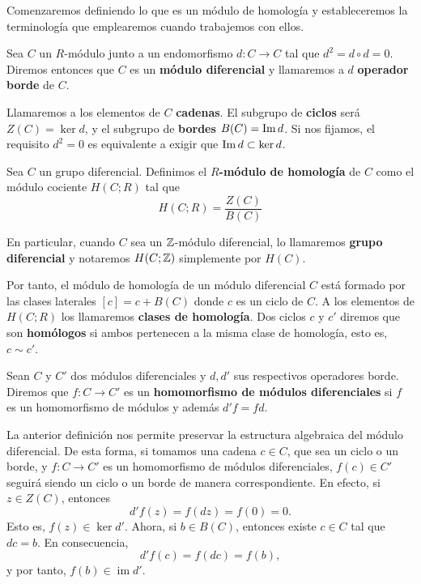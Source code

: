 Comenzaremos definiendo lo que es un módulo de homología y estableceremos la terminología
que emplearemos cuando trabajemos con ellos.

\begin{definicion}
	Sea \(C\) un \(R\)-módulo junto a un endomorfismo \(d: C \rightarrow C\) tal que \(d^{2}
	= d \circ d = 0\). Diremos entonces que \(C\) es un \textbf{módulo diferencial} y
	llamaremos a \(d\) \textbf{operador borde} de \(C\).
\end{definicion}

Llamaremos a los elementos de \(C\) \textbf{cadenas}. El subgrupo de \textbf{ciclos}
será \(Z(C) = \ker d\), y el subgrupo de \textbf{bordes} \(B(C) = \operatorname{Im} d\). Si nos
fijamos, el requisito \(d^{2} = 0\) es equivalente a exigir que \(\operatorname{Im}{d}\subset \ker
{d}\).

\begin{definicion}
	Sea \(C\) un grupo diferencial. Definimos el \textbf{\(R\)-módulo de homología} de
	\(C\) como el módulo cociente \(H(C;R)\) tal que
	\[
	H(C;R) = \frac{Z(C)}{B(C)}
	\]
\end{definicion}

En particular, cuando \(C\) sea un \(\mathbb{Z}\)-módulo diferencial, lo llamaremos \textbf{grupo
	diferencial} y notaremos \(H(C;\mathbb{Z})\) simplemente por \(H(C)\).

Por tanto, el módulo de homología de un módulo diferencial \(C\) está formado por
las clases laterales \([c] = c + B(C)\) donde \(c\) es un ciclo de \(C\). A los elementos
de \(H(C;R)\) los llamaremos \textbf{clases de homología}. Dos ciclos \(c\) y \(c'\) diremos
que son \textbf{homólogos} si ambos pertenecen a la misma clase de homología, esto
es, \(c \sim c'\).

\begin{definicion}
	Sean \(C\) y \(C'\) dos módulos diferenciales y \(d, d'\) sus respectivos operadores
	borde. Diremos que \(f: C \rightarrow C'\) es un \textbf{homomorfismo de módulos
		diferenciales} si \(f\) es un homomorfismo de módulos y además \(d'f = fd\).
\end{definicion}

La anterior definición nos permite preservar la estructura algebraica del módulo
diferencial. De esta forma, si tomamos una cadena \(c \in C\), que sea un ciclo o un
borde, y \(f\colon C \to C'\) es un homomorfismo de módulos diferenciales,
\(f(c) \in C'\) seguirá siendo un ciclo o un borde de manera correspondiente. En efecto,
si \(z \in Z(C)\), entonces
\[
d'f(z) = f(dz) = f(0) = 0.
\]
Esto es, \(f(z) \in \ker d'\). Ahora, si \(b \in B(C)\), entonces existe \(c \in C\) tal que \(dc = b\). En consecuencia,
\[
d'f(c) = f(dc) = f(b),
\]
y por tanto, \(f(b) \in \operatorname{im} d'\).

